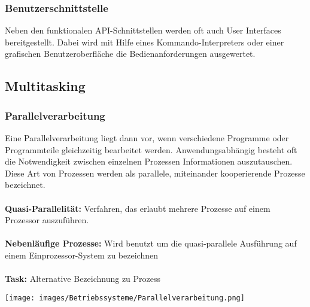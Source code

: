 \subsubsection{Benutzerschnittstelle}
Neben den funktionalen API-Schnittstellen werden oft auch User Interfaces bereitgestellt. Dabei wird mit Hilfe eines Kommando-Interpreters oder einer grafischen Benutzeroberfläche die Bedienanforderungen ausgewertet.


\subsection{Multitasking}
\begin{minipage}{0.5\textwidth}
    \subsubsection{Parallelverarbeitung}
    Eine Parallelverarbeitung liegt dann vor, wenn verschiedene Programme oder Programmteile gleichzeitig bearbeitet werden. Anwendungsabhängig besteht oft die Notwendigkeit zwischen einzelnen Prozessen Informationen auszutauschen. Diese Art von Prozessen werden als parallele, miteinander kooperierende Prozesse bezeichnet. \\ \\
    \textbf{Quasi-Parallelität:} Verfahren, das erlaubt mehrere Prozesse auf einem Prozessor auszuführen.\\ \\
    \textbf{Nebenläufige Prozesse:} Wird benutzt um die quasi-parallele Ausführung auf einem Einprozessor-System zu bezeichnen\\ \\
    \textbf{Task:} Alternative Bezeichnung zu Prozess \newline
\end{minipage}
\hfill
\begin{minipage}{0.45\textwidth}
    \texttt{[image: images/Betriebssysteme/Parallelverarbeitung.png]}
\end{minipage}
	

